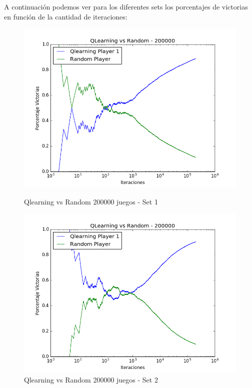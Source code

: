 A continuación podemos ver para los diferentes sets los porcentajes de victorias en función de la cantidad de iteraciones:

\begin{figure}[H]
 \centering
 \begin{minipage}{.45\textwidth}
	\centering
	\includegraphics[scale=0.35]{img1/QlearningVsRandom_200000_6x5_hernan.png}
        \caption{Qlearning vs Random 200000 juegos - Set 1}
  \end{minipage}
 \begin{minipage}{.5\textwidth}
	\centering
	\includegraphics[scale=0.35]{img1/QlearningVsRandom_200000_6x5_cyntia.png}
        \caption{Qlearning vs Random 200000 juegos - Set 2}
  \end{minipage}
\end{figure}


